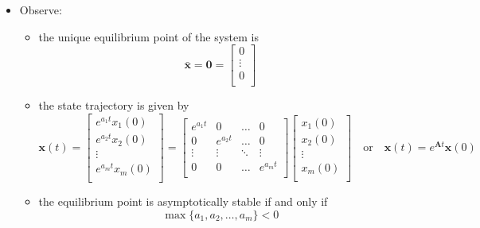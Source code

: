 \documentclass[12pt,a4paper]{article}
\begin{document}
\begin{itemize}
\begin{itemize}
  \item Observe:
    \begin{itemize}
    \item the unique equilibrium point of the system is
      \begin{equation}\nonumber%
        \bar{\bm{x}}
        =
        \bm{0}
        =
      \begin{bmatrix}
        0 \\
        \vdots \\
        0 \\
      \end{bmatrix}
      \end{equation}
    \item the state trajectory is given by
      \begin{equation}\nonumber%
        \bm{x}(t)
        =
      \begin{bmatrix}
        e^{a_{1}t}x_{1}(0) \\
        e^{a_{2}t}x_{2}(0) \\
        \vdots \\
        e^{a_{m}t}x_{m}(0) \\
      \end{bmatrix}
      =
      \begin{bmatrix}
        e^{a_{1}t} & 0 & \ldots & 0 \\
        0 & e^{a_{2}t} & \ldots & 0 \\
        \vdots & \vdots & \ddots & \vdots \\
        0 & 0 & \ldots & e^{a_{m}t} \\
      \end{bmatrix}
      \begin{bmatrix}
        x_{1}(0) \\
        x_{2}(0) \\
        \vdots \\
        x_{m}(0) \\
      \end{bmatrix}
      \quad\text{or}\quad
      \bm{x}(t) = e^{\bm{A}t}\bm{x}(0)
      \end{equation}
    \item the equilibrium point is asymptotically stable if and only if
      \begin{equation}\nonumber%
        \max\{a_{1}, a_{2}, \ldots, a_{m}\}<0
      \end{equation}
    \end{itemize}


\end{itemize}
\end{itemize}
\end{document}
